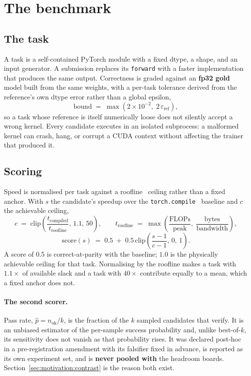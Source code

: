 \section{The benchmark}
\label{sec:benchmark}

\subsection{The task}

A task is a self-contained PyTorch module with a fixed dtype, a shape, and an input generator. A
submission replaces its \texttt{forward} with a faster implementation that produces the same
output. Correctness is graded against an \textbf{fp32 gold} model built from the same weights,
with a per-task tolerance derived from the reference's own dtype error rather than a global
epsilon,
\[
  \text{bound} \;=\; \max\!\left(2\times 10^{-2},\; 2\,\varepsilon_{\mathrm{ref}}\right),
\]
so a task whose reference is itself numerically loose does not silently accept a wrong kernel.
Every candidate executes in an isolated subprocess: a malformed kernel can crash, hang, or
corrupt a CUDA context without affecting the trainer that produced it.

\subsection{Scoring}

Speed is normalised per task against a roofline~\cite{williams2009roofline} ceiling rather than a fixed anchor. With $s$ the
candidate's speedup over the \texttt{torch.compile}~\cite{ansel2024pytorch2} baseline and $c$ the achievable ceiling,
\[
  c \;=\; \mathrm{clip}\!\left(\frac{t_{\mathrm{compiled}}}{t_{\mathrm{roofline}}},\,1.1,\,50\right),
  \qquad
  t_{\mathrm{roofline}} \;=\; \max\!\left(\frac{\mathrm{FLOPs}}{\text{peak}},\; \frac{\text{bytes}}{\text{bandwidth}}\right),
\]
\[
  \mathrm{score}(s) \;=\; 0.5 \;+\; 0.5\,\mathrm{clip}\!\left(\frac{s-1}{c-1},\,0,\,1\right).
\]
A score of $0.5$ is correct-at-parity with the baseline; $1.0$ is the physically achievable
ceiling for that task. Normalising by the roofline makes a task with $1.1\times$ of available
slack and a task with $40\times$ contribute equally to a mean, which a fixed anchor does not.

\paragraph{The second scorer.} Pass rate, $\hat{p} = n_{\mathrm{ok}}/k$, is the fraction of the
$k$ sampled candidates that verify. It is an unbiased estimator of the per-sample success
probability and, unlike best-of-$k$, its sensitivity does not vanish as that probability rises.
It was declared post-hoc in a pre-registration amendment with its falsifier fixed in advance, is
reported as its own experiment set, and is \textbf{never pooled with} the headroom boards.
Section~\ref{sec:motivation:contrast} is the reason both exist.

